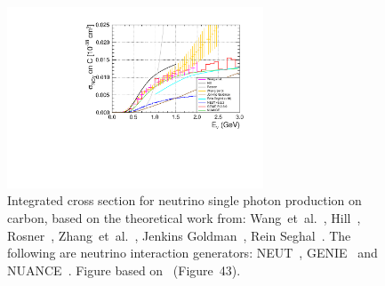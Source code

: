 \begin{figure}[ht]
  \center
  \includegraphics[width=0.68\textwidth]{images/Pheno/NCG_integrated.pdf}
  \caption[Integrated cross section for neutrino single photon
  production on carbon]{Integrated cross section for neutrino single
    photon production on carbon, based on the theoretical work from:
    Wang~et~al.~\cite{Alvarez2014}, Hill~\cite{Hills2007},
    Rosner~\cite{Rosner2015}, Zhang~et~al.~\cite{Serot2012}, Jenkins
    Goldman~\cite{Jenkins}, Rein Seghal~\cite{ReinCohGamma}. The
    following are neutrino interaction generators:
    \Gls{NEUT}~\cite{NEUT}, \Gls{GENIE}~\cite{GENIE1,GENIE2} and
    \Gls{NUANCE}~\cite{nuance}. Figure based on~\cite{Garvey:2014exa}
    (Figure~43).}
  \label{fig:integratedncg}
\end{figure}

